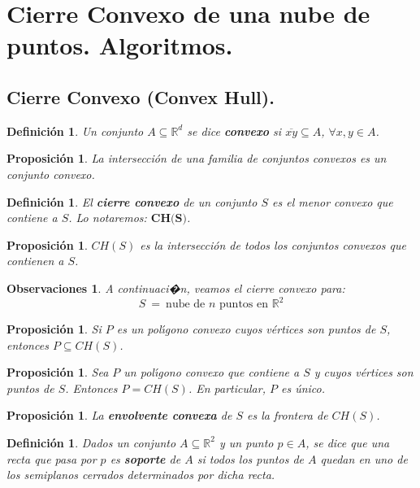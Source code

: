 \documentclass[ebook,oneside]{memoir}
\newtheorem{prop}[thm]{Proposición}
\newtheorem{defn}[thm]{Definición}
\newtheorem{rem}[thm]{Observaciones}
\begin{document}
\section{Cierre Convexo de una nube de puntos. Algoritmos.}

\subsection{Cierre Convexo (Convex Hull).}

\begin{defn} Un conjunto $A \subseteq \mathbb{R}^d$ se dice
\textbf{convexo} si $\overline{xy} \subseteq A$, $\forall x,y \in A$.
\end{defn}

\begin{prop} La intersecci\'{o}n de una familia de
conjuntos convexos es un conjunto convexo.
\end{prop}

\begin{defn} El \textbf{cierre convexo} de un conjunto $S$
es el menor convexo que contiene a $S$. Lo notaremos: $\textbf{CH(S)}$.
\end{defn}

\begin{prop} $CH(S)$ es la intersecci\'{o}n de todos los
conjuntos convexos que contienen a $S$.
\end{prop}

\begin{rem} A continuaci�n, veamos el cierre convexo para:
$$S \ = \ \mbox{nube de $n$ puntos en } \mathbb{R}^2$$
\end{rem}

\begin{prop} Si $P$ es un pol\'{\i}gono convexo cuyos
v\'{e}rtices son puntos de $S$, entonces $P\subseteq CH(S)$.
\end{prop}

\begin{prop} Sea $P$ un pol\'{\i}gono convexo que contiene
a $S$ y cuyos v\'{e}rtices son puntos de $S$. Entonces $P=CH(S)$. En
particular, $P$ es \'{u}nico.
\end{prop}

\begin{prop} La \textbf{envolvente convexa} de $S$ es la
frontera de $CH(S)$.
\end{prop}

\begin{defn} Dados un conjunto $A \subseteq \mathbb{R}^2$ y un
punto $p \in A$, se dice que una recta que pasa por $p$ es
\textbf{soporte} de $A$ si todos los puntos de $A$ quedan en uno de los
semiplanos cerrados determinados por dicha recta.
\end{defn}
\end{document}
